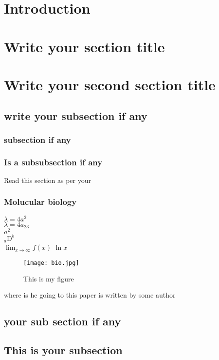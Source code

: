 \label{chap.2}
\section{Introduction}


\section{Write your section title}

\section{Write your second section title}
\label{section2.3}
\subsection{write your subsection if any}

\subsubsection{subsection if any}

\subsubsection{Is a subsubsection if any} 
Read this section \cite{kesarwani2019new} as per your

\subsubsection{Molucular biology} 
$ \lambda = 4a^2 $ \\
$ \lambda = 4a_{23} $ \\
$ a^2 $ \\
$ _{a}\textrm{D}^b $ \\
$\lim_{x\to\infty} f(x)$
$\ln x$
\begin{figure}[h]
	\centering
	\texttt{[image: bio.jpg]}
	\caption{This is my figure}
\end{figure}

where is \cite{doran2007bio} he going to this paper is written by \cite{mathew1995results} some author \cite{105bellare1996linearity}
\subsection{your sub section if any}

\subsection{This is your subsection}
